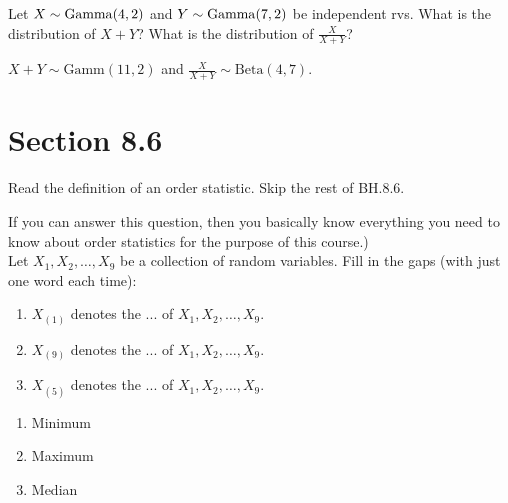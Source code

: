 \begin{exercise}
Let $X \sim \mathrm{Gamma}(4,2)$ and $Y \sim \mathrm{Gamma}(7,2)$ be independent rvs. What is the distribution of $X+Y$? What is the distribution of $\frac{X}{X+Y}$?

\begin{solution}
$X+Y \sim \text{Gamm}(11,2)$ and $\frac{X}{X+Y} \sim \text{Beta}(4,7)$.
\end{solution}
\end{exercise}





\section{Section 8.6}
\label{sec:section-8.6}

Read the definition of an order statistic. Skip the rest of BH.8.6.

\begin{exercise}
If you can answer this question, then you basically know everything you need to know about order statistics for the purpose of this course.)\\
Let $X_1,X_2,\ldots,X_9$ be a collection of random variables. Fill in the gaps (with just one word each time):
\begin{enumerate}
    \item $X_{(1)}$ denotes the ... of $X_1,X_2,\ldots,X_9$.
    \item $X_{(9)}$ denotes the ... of $X_1,X_2,\ldots,X_9$.
    \item $X_{(5)}$ denotes the ... of $X_1,X_2,\ldots,X_9$.
\end{enumerate}
\begin{solution}
\begin{enumerate}
    \item Minimum
    \item Maximum
    \item Median
\end{enumerate}
\end{solution}
\end{exercise}

